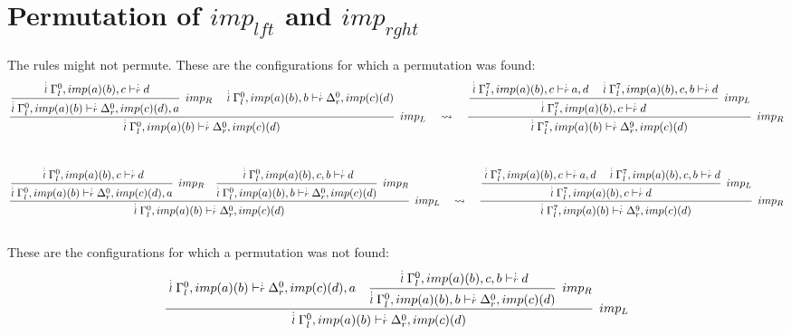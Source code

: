 


%
\pagestyle{empty}
\section{Permutation of $imp_{lft}$ and $imp_{rght}$}

The rules might not permute. These are the configurations for which a permutation was found:
{\scriptsize
\[
\cfrac{\cfrac{ \ndots{l} \Gamma_{l}^{0}, imp (a) (b) , c \vdash  \ndots{r} d}
{ \ndots{l} \Gamma_{l}^{0}, imp (a) (b)  \vdash  \ndots{r} \Delta_{r}^{0}, imp (c) (d) , a} \;\; imp_{R}
\quad
 \ndots{l} \Gamma_{l}^{0}, imp (a) (b) , b \vdash  \ndots{r} \Delta_{r}^{0}, imp (c) (d) }
{ \ndots{l} \Gamma_{l}^{0}, imp (a) (b)  \vdash  \ndots{r} \Delta_{r}^{0}, imp (c) (d) } \;\; imp_{L}
\quad\rightsquigarrow\quad
\cfrac{\cfrac{ \ndots{l} \Gamma_{l}^{7}, imp (a) (b) , c \vdash  \ndots{r} a, d
\quad
 \ndots{l} \Gamma_{l}^{7}, imp (a) (b) , c, b \vdash  \ndots{r} d}
{ \ndots{l} \Gamma_{l}^{7}, imp (a) (b) , c \vdash  \ndots{r} d} \;\; imp_{L}}
{ \ndots{l} \Gamma_{l}^{7}, imp (a) (b)  \vdash  \ndots{r} \Delta_{r}^{9}, imp (c) (d) } \;\; imp_{R}
\]
}
\\[0.7cm]

{\scriptsize
\[
\cfrac{\cfrac{ \ndots{l} \Gamma_{l}^{0}, imp (a) (b) , c \vdash  \ndots{r} d}
{ \ndots{l} \Gamma_{l}^{0}, imp (a) (b)  \vdash  \ndots{r} \Delta_{r}^{0}, imp (c) (d) , a} \;\; imp_{R}
\quad
\cfrac{ \ndots{l} \Gamma_{l}^{0}, imp (a) (b) , c, b \vdash  \ndots{r} d}
{ \ndots{l} \Gamma_{l}^{0}, imp (a) (b) , b \vdash  \ndots{r} \Delta_{r}^{0}, imp (c) (d) } \;\; imp_{R}}
{ \ndots{l} \Gamma_{l}^{0}, imp (a) (b)  \vdash  \ndots{r} \Delta_{r}^{0}, imp (c) (d) } \;\; imp_{L}
\quad\rightsquigarrow\quad
\cfrac{\cfrac{ \ndots{l} \Gamma_{l}^{7}, imp (a) (b) , c \vdash  \ndots{r} a, d
\quad
 \ndots{l} \Gamma_{l}^{7}, imp (a) (b) , c, b \vdash  \ndots{r} d}
{ \ndots{l} \Gamma_{l}^{7}, imp (a) (b) , c \vdash  \ndots{r} d} \;\; imp_{L}}
{ \ndots{l} \Gamma_{l}^{7}, imp (a) (b)  \vdash  \ndots{r} \Delta_{r}^{9}, imp (c) (d) } \;\; imp_{R}
\]
}
\\[0.7cm]

These are the configurations for which a permutation was not found:
{\scriptsize
\[
\cfrac{ \ndots{l} \Gamma_{l}^{0}, imp (a) (b)  \vdash  \ndots{r} \Delta_{r}^{0}, imp (c) (d) , a
\quad
\cfrac{ \ndots{l} \Gamma_{l}^{0}, imp (a) (b) , c, b \vdash  \ndots{r} d}
{ \ndots{l} \Gamma_{l}^{0}, imp (a) (b) , b \vdash  \ndots{r} \Delta_{r}^{0}, imp (c) (d) } \;\; imp_{R}}
{ \ndots{l} \Gamma_{l}^{0}, imp (a) (b)  \vdash  \ndots{r} \Delta_{r}^{0}, imp (c) (d) } \;\; imp_{L}
\]
}
\\[0.7cm]
%
